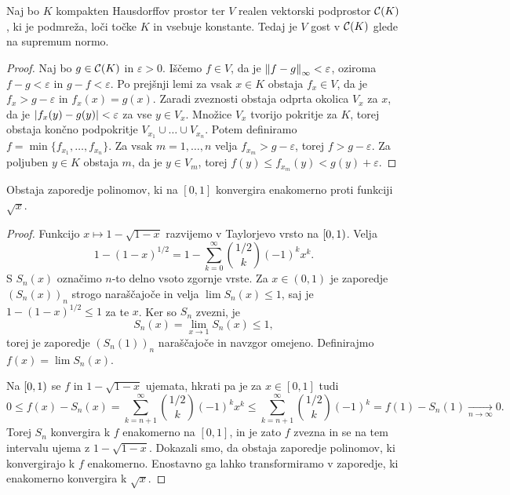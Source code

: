 \begin{izrek}
  Naj bo $K$ kompakten Hausdorffov prostor ter $V$ realen vektorski podprostor
  $\mathcal{C}(K)$, ki je podmreža, loči točke $K$ in vsebuje konstante.
  Tedaj je $V$ gost v $\mathcal{C}(K)$ glede na supremum normo.
\end{izrek}

\begin{proof}
  Naj bo $g \in \mathcal{C}(K)$ in $\varepsilon > 0$.
  Iščemo $f \in V$, da je $\left\lVert f-g\right\rVert_\infty < \varepsilon$, oziroma $f-g <
  \varepsilon$ in $g-f < \varepsilon$.
  Po prejšnji lemi za vsak $x \in K$ obstaja $f_x \in V$, da je $f_x > g -
  \varepsilon$ in $f_x(x) = g(x)$.
  Zaradi zveznosti obstaja odprta okolica $V_x$ za $x$, da je $\left| f_x(y) -
	g(y) \right| < \varepsilon$ za vse $y \in V_x$.
  Množice $V_x$ tvorijo pokritje za $K$, torej obstaja končno podpokritje
  $V_{x_1} \cup \ldots \cup V_{x_n}$.
  Potem definiramo $f = \min \{ f_{x_1}, \ldots, f_{x_n} \}$.
  Za vsak $m = 1, \ldots, n$ velja $f_{x_m} > g - \varepsilon$, torej $f > g -
  \varepsilon$.
  Za poljuben $y \in K$ obstaja $m$, da je $y \in V_m$, torej $f(y) \le
  f_{x_m}(y) < g(y) + \varepsilon$.
\end{proof}


\begin{lema}
  Obstaja zaporedje polinomov, ki na $[0,1]$ konvergira enakomerno proti
  funkciji $\sqrt{x}$.
\end{lema}

\begin{proof}
  Funkcijo $x \mapsto 1 - \sqrt{1-x}$ razvijemo v Taylorjevo vrsto na $\left[0,1\right)$.
  Velja
  \[
	1 - (1 - x)^{1/2} = 1 - \sum_{k=0}^\infty \binom{1/2}{k} (-1)^k x^k.
  \]
  S $S_n(x)$ označimo $n$-to delno vsoto zgornje vrste.
  Za $x \in (0,1)$ je zaporedje $(S_n(x))_n$ strogo naraščajoče in velja $\lim
  S_n(x) \le 1$, saj je $1 - (1 - x)^{1/2} \le 1$ za te $x$.
  Ker so $S_n$ zvezni, je
  \[
	S_n(x) = \lim_{x \to 1} S_n(x) \le 1,
  \]
  torej je zaporedje $(S_n(1))_n$ naraščajoče in navzgor omejeno.
  Definirajmo $f(x) = \lim S_n(x)$.

  Na $\left[0,1\right)$ se $f$ in $1 - \sqrt{1-x}$ ujemata, hkrati pa je za $x \in
  [0,1]$ tudi
  \[
	0 \le f(x) - S_n(x) = \sum_{k=n+1}^\infty \binom{1/2}{k} (-1)^k x^k
	\le \sum_{k=n+1}^\infty \binom{1/2}{k} (-1)^k
	= f(1) - S_n(1) \xrightarrow[n \to \infty]{} 0.
  \]
  Torej $S_n$ konvergira k $f$ enakomerno na $[0,1]$, in je zato $f$ zvezna in
  se na tem intervalu ujema z $1 - \sqrt{1-x}$.
  Dokazali smo, da obstaja zaporedje polinomov, ki konvergirajo k $f$
  enakomerno.
  Enostavno ga lahko transformiramo v zaporedje, ki enakomerno konvergira k
  $\sqrt{x}$.
\end{proof}

